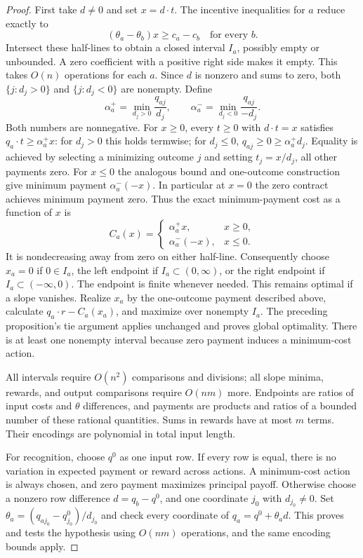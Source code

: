 \documentclass[11pt]{article}
\theoremstyle{definition}
\begin{document}
\begin{proof}
First take $d\ne0$ and set $x=d\cdot t$. The incentive inequalities for $a$
reduce exactly to
\[
 (\theta_a-\theta_b)x\geq c_a-c_b\quad\text{for every }b.
\]
Intersect these half-lines to obtain a closed interval $I_a$, possibly empty
or unbounded. A zero coefficient with a positive right side makes it empty.
This takes $O(n)$ operations for each $a$.
Since $d$ is nonzero and sums to zero, both $\{j:d_j>0\}$ and
$\{j:d_j<0\}$ are nonempty. Define
\[
 \alpha_a^+=\min_{d_j>0}\frac{q_{aj}}{d_j},\qquad
 \alpha_a^-=\min_{d_j<0}\frac{q_{aj}}{-d_j}.
\]
Both numbers are nonnegative. For $x\geq0$, every $t\geq0$ with $d\cdot t=x$
satisfies $q_a\cdot t\geq\alpha_a^+x$: for $d_j>0$ this holds termwise;
for $d_j\leq0$, $q_{aj}\geq0\geq\alpha_a^+d_j$.
Equality is achieved by selecting a minimizing outcome $j$ and setting
$t_j=x/d_j$, all other payments zero. For $x\leq0$ the analogous bound and
one-outcome construction give minimum payment $\alpha_a^-(-x)$.
In particular at $x=0$ the zero contract achieves minimum payment zero.
Thus the exact minimum-payment cost as a function of $x$ is
\[
 C_a(x)=\begin{cases}\alpha_a^+x,&x\geq0,\\
 \alpha_a^-(-x),&x\leq0.\end{cases}
\]
It is nondecreasing away from zero on either half-line. Consequently choose
$x_a=0$ if $0\in I_a$, the left endpoint if $I_a\subset(0,\infty)$, or the
right endpoint if $I_a\subset(-\infty,0)$. The endpoint is finite whenever
needed. This remains optimal if a slope vanishes. Realize $x_a$ by the
one-outcome payment described above, calculate
$q_a\cdot r-C_a(x_a)$, and maximize over nonempty $I_a$.
The preceding proposition's tie argument applies unchanged and proves global
optimality. There is at least one nonempty interval because zero payment
induces a minimum-cost action.

All intervals require $O(n^2)$ comparisons and divisions; all slope minima,
rewards, and output comparisons require $O(nm)$ more. Endpoints are ratios of
input costs and $\theta$ differences, and payments are products and ratios of
a bounded number of these rational quantities. Sums in rewards have at most
$m$ terms. Their encodings are polynomial in total input length.

For recognition, choose $q^0$ as one input row. If every row is equal, there
is no variation in expected payment or reward across actions. A minimum-cost
action is always chosen, and zero payment maximizes principal payoff.
Otherwise choose a nonzero row difference $d=q_b-q^0$, and one coordinate
$j_0$ with $d_{j_0}\ne0$. Set
$\theta_a=(q_{aj_0}-q^0_{j_0})/d_{j_0}$ and check every coordinate of
$q_a=q^0+\theta_a d$. This proves and tests the hypothesis using $O(nm)$
operations, and the same encoding bounds apply.
\end{proof}
\end{document}
